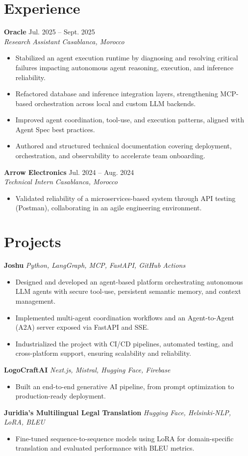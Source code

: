 \documentclass[11pt,a4paper]{article}
\newcommand{\resumeSubheading}[4]{
  \vspace{3pt}
  \noindent\textbf{#1} \hfill #2 \\
  \textit{#3} \hfill \textit{#4}
  \vspace{2pt}
}
\newcommand{\resumeProject}[2]{
  \vspace{3pt}
  \noindent\textbf{#1} \hfill \textit{#2}
  \vspace{2pt}
}
\begin{document}
\section{Experience}
\resumeSubheading{Oracle}{Jul. 2025 -- Sept. 2025}{Research Assistant}{Casablanca, Morocco}
\begin{itemize}
  \item Stabilized an agent execution runtime by diagnosing and resolving critical failures impacting autonomous agent reasoning, execution, and inference reliability.
  \item Refactored database and inference integration layers, strengthening MCP-based orchestration across local and custom LLM backends.
  \item Improved agent coordination, tool-use, and execution patterns, aligned with Agent Spec best practices.
  \item Authored and structured technical documentation covering deployment, orchestration, and observability to accelerate team onboarding.
\end{itemize}
\resumeSubheading{Arrow Electronics}{Jul. 2024 -- Aug. 2024}{Technical Intern}{Casablanca, Morocco}
\begin{itemize}
  \item Validated reliability of a microservices-based system through API testing (Postman), collaborating in an agile engineering environment.
\end{itemize}

\section{Projects}
\resumeProject{Joshu}{Python, LangGraph, MCP, FastAPI, GitHub Actions}
\begin{itemize}
  \item Designed and developed an agent-based platform orchestrating autonomous LLM agents with secure tool-use, persistent semantic memory, and context management.
  \item Implemented multi-agent coordination workflows and an Agent-to-Agent (A2A) server exposed via FastAPI and SSE.
  \item Industrialized the project with CI/CD pipelines, automated testing, and cross-platform support, ensuring scalability and reliability.
\end{itemize}
\resumeProject{LogoCraftAI}{Next.js, Mistral, Hugging Face, Firebase}
\begin{itemize}
  \item Built an end-to-end generative AI pipeline, from prompt optimization to production-ready deployment.
\end{itemize}
\resumeProject{Juridia's Multilingual Legal Translation}{Hugging Face, Helsinki-NLP, LoRA, BLEU}
\begin{itemize}
  \item Fine-tuned sequence-to-sequence models using LoRA for domain-specific translation and evaluated performance with BLEU metrics.
\end{itemize}
\end{document}
